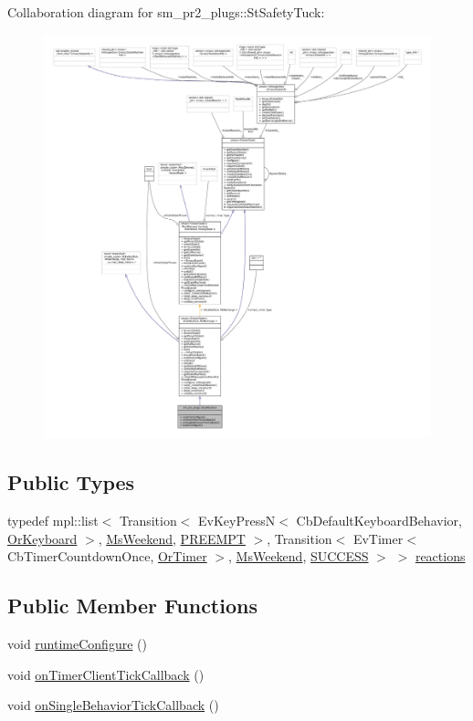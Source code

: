 Collaboration diagram for sm\+\_\+pr2\+\_\+plugs\+:\+:St\+Safety\+Tuck\+:
\nopagebreak
\begin{figure}[H]
\begin{center}
\leavevmode
\includegraphics[width=350pt]{structsm__pr2__plugs_1_1StSafetyTuck__coll__graph}
\end{center}
\end{figure}
\subsection*{Public Types}
\begin{DoxyCompactItemize}
\item 
typedef mpl\+::list$<$ Transition$<$ Ev\+Key\+PressN$<$ Cb\+Default\+Keyboard\+Behavior, \hyperlink{classsm__pr2__plugs_1_1OrKeyboard}{Or\+Keyboard} $>$, \hyperlink{classsm__pr2__plugs_1_1MsWeekend}{Ms\+Weekend}, \hyperlink{classPREEMPT}{P\+R\+E\+E\+M\+PT} $>$, Transition$<$ Ev\+Timer$<$ Cb\+Timer\+Countdown\+Once, \hyperlink{classsm__pr2__plugs_1_1OrTimer}{Or\+Timer} $>$, \hyperlink{classsm__pr2__plugs_1_1MsWeekend}{Ms\+Weekend}, \hyperlink{classSUCCESS}{S\+U\+C\+C\+E\+SS} $>$ $>$ \hyperlink{structsm__pr2__plugs_1_1StSafetyTuck_a73fb9b6d46048be9361072d6c72939a3}{reactions}
\end{DoxyCompactItemize}
\subsection*{Public Member Functions}
\begin{DoxyCompactItemize}
\item 
void \hyperlink{structsm__pr2__plugs_1_1StSafetyTuck_ae58dc354ff826ff1a124376272f75cc9}{runtime\+Configure} ()
\item 
void \hyperlink{structsm__pr2__plugs_1_1StSafetyTuck_aa1082813087c8201894aa1047ecf8a9b}{on\+Timer\+Client\+Tick\+Callback} ()
\item 
void \hyperlink{structsm__pr2__plugs_1_1StSafetyTuck_ac3d9dc48854336a560515bb30c7d9dd9}{on\+Single\+Behavior\+Tick\+Callback} ()
\end{DoxyCompactItemize}
